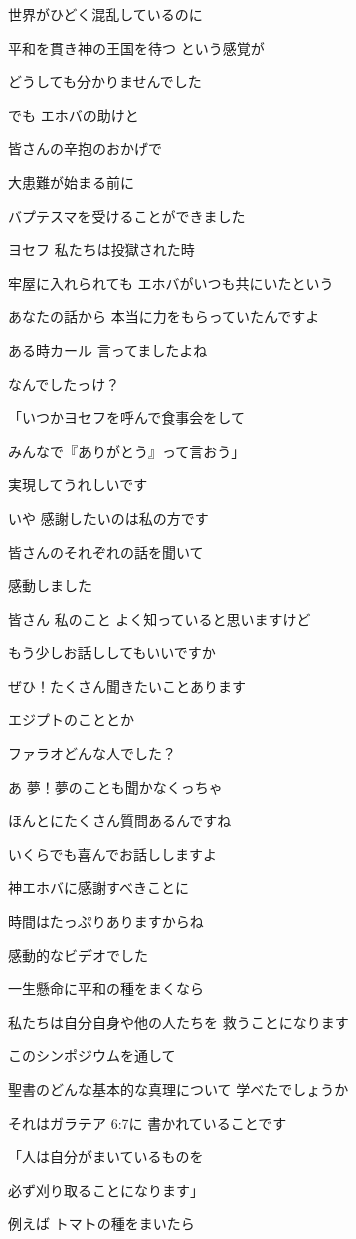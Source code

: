 \documentclass[twocolumn]{jsarticle}
\begin{document}
世界がひどく混乱しているのに

平和を貫き神の王国を待つ
という感覚が

どうしても分かりませんでした

でも エホバの助けと

皆さんの辛抱のおかげで

大患難が始まる前に

バプテスマを受けることができました

ヨセフ 私たちは投獄された時

牢屋に入れられても
エホバがいつも共にいたという

あなたの話から
本当に力をもらっていたんですよ

ある時カール 言ってましたよね

なんでしたっけ？

「いつかヨセフを呼んで食事会をして

みんなで『ありがとう』って言おう」

実現してうれしいです

いや 感謝したいのは私の方です

皆さんのそれぞれの話を聞いて

感動しました

皆さん 私のこと
よく知っていると思いますけど

もう少しお話ししてもいいですか

ぜひ！たくさん聞きたいことあります

エジプトのこととか

ファラオどんな人でした？

あ 夢！夢のことも聞かなくっちゃ

ほんとにたくさん質問あるんですね

いくらでも喜んでお話ししますよ

神エホバに感謝すべきことに

時間はたっぷりありますからね

感動的なビデオでした

一生懸命に平和の種をまくなら

私たちは自分自身や他の人たちを
救うことになります

このシンポジウムを通して

聖書のどんな基本的な真理について
学べたでしょうか

それはガラテア 6:7に
書かれていることです

「人は自分がまいているものを

必ず刈り取ることになります」

例えば トマトの種をまいたら
\end{document}
